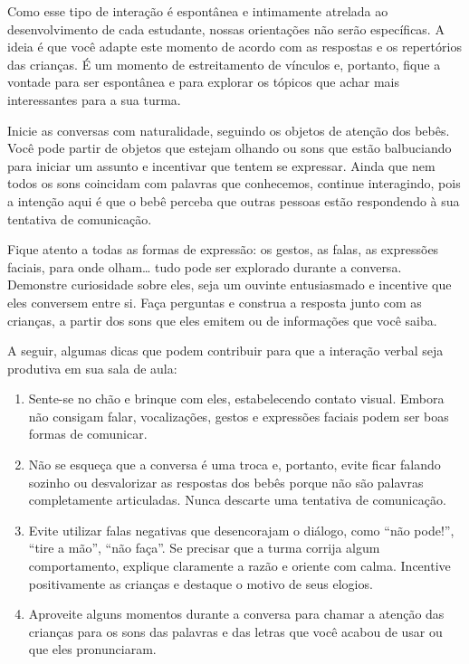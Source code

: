 \documentclass[11pt]{extarticle}
\begin{document}
\begin{enumerate}
Como esse tipo de interação é espontânea e intimamente atrelada ao 
desenvolvimento de cada estudante, nossas orientações não serão específicas. 
A ideia é que você adapte este momento de acordo com as respostas e os 
repertórios das crianças. É um momento de estreitamento de vínculos e, portanto, 
fique a vontade para ser espontânea e para explorar os tópicos que achar 
mais interessantes para a sua turma.

Inicie as conversas com naturalidade, seguindo os objetos de atenção dos bebês. 
Você pode partir de objetos que estejam olhando ou sons que estão balbuciando 
para iniciar um assunto e incentivar que tentem se expressar. Ainda que nem 
todos os sons coincidam com palavras que conhecemos, continue interagindo, 
pois a intenção aqui é que o bebê perceba que outras pessoas estão respondendo 
à sua tentativa de comunicação. 

Fique atento a todas as formas de expressão: os gestos, as falas, as 
expressões faciais, para onde olham\ldots{} tudo pode ser explorado durante a conversa. 
Demonstre curiosidade sobre eles, seja um ouvinte entusiasmado e incentive que eles 
conversem entre si. Faça perguntas e construa a resposta junto com as crianças, 
a partir dos sons que eles emitem ou de informações que você saiba. 

A seguir, algumas dicas que podem contribuir para que a interação verbal 
seja produtiva em sua sala de aula: 

\begin{enumerate}
\item Sente-se no chão e brinque com eles, estabelecendo 
contato visual. Embora não consigam falar, vocalizações, 
gestos e expressões faciais podem ser boas formas de comunicar.

\item Não se esqueça que a conversa é uma troca e, portanto, 
evite ficar falando sozinho ou desvalorizar as respostas dos 
bebês porque não são palavras completamente articuladas. 
Nunca descarte uma tentativa de comunicação. 

\item Evite utilizar falas negativas que desencorajam o diálogo, 
como ``não pode!'', ``tire a mão'', ``não faça''. Se precisar que a turma 
corrija algum comportamento, explique claramente a razão e 
oriente com calma. Incentive positivamente as crianças e 
destaque o motivo de seus elogios. 

\item Aproveite alguns momentos durante a conversa para chamar 
a atenção das crianças para os sons das palavras e das letras que você 
acabou de usar ou que eles pronunciaram.  


\end{enumerate}
\end{enumerate}
\end{document}
